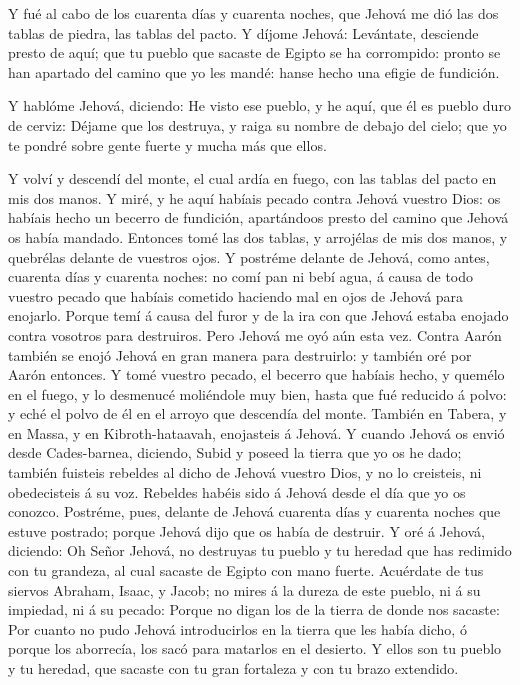  Y fué al cabo de los cuarenta días y cuarenta noches, que
Jehová me dió las dos tablas de piedra, las tablas del pacto.
 Y díjome Jehová: Levántate, desciende presto de aquí; que
tu pueblo que sacaste de Egipto se ha corrompido: pronto se han apartado
del camino que yo les mandé: hanse hecho una efigie de fundición.

 Y hablóme Jehová, diciendo: He visto ese pueblo, y he
aquí, que él es pueblo duro de cerviz:  Déjame que los
destruya, y raiga su nombre de debajo del cielo; que yo te pondré sobre
gente fuerte y mucha más que ellos.

 Y volví y descendí del monte, el cual ardía en fuego, con
las tablas del pacto en mis dos manos.  Y miré, y he aquí
habíais pecado contra Jehová vuestro Dios: os habíais hecho un becerro
de fundición, apartándoos presto del camino que Jehová os había mandado.
 Entonces tomé las dos tablas, y arrojélas de mis dos
manos, y quebrélas delante de vuestros ojos.  Y postréme
delante de Jehová, como antes, cuarenta días y cuarenta noches: no comí
pan ni bebí agua, á causa de todo vuestro pecado que habíais cometido
haciendo mal en ojos de Jehová para enojarlo.  Porque temí
á causa del furor y de la ira con que Jehová estaba enojado contra
vosotros para destruiros. Pero Jehová me oyó aún esta vez. 
Contra Aarón también se enojó Jehová en gran manera para destruirlo: y
también oré por Aarón entonces.  Y tomé vuestro pecado, el
becerro que habíais hecho, y quemélo en el fuego, y lo desmenucé
moliéndole muy bien, hasta que fué reducido á polvo: y eché el polvo de
él en el arroyo que descendía del monte.  También en
Tabera, y en Massa, y en Kibroth-hataavah, enojasteis á Jehová.
 Y cuando Jehová os envió desde Cades-barnea, diciendo,
Subid y poseed la tierra que yo os he dado; también fuisteis rebeldes al
dicho de Jehová vuestro Dios, y no lo creisteis, ni obedecisteis á su
voz.  Rebeldes habéis sido á Jehová desde el día que yo os
conozco.  Postréme, pues, delante de Jehová cuarenta días y
cuarenta noches que estuve postrado; porque Jehová dijo que os había de
destruir.  Y oré á Jehová, diciendo: Oh Señor Jehová, no
destruyas tu pueblo y tu heredad que has redimido con tu grandeza, al
cual sacaste de Egipto con mano fuerte.  Acuérdate de tus
siervos Abraham, Isaac, y Jacob; no mires á la dureza de este pueblo, ni
á su impiedad, ni á su pecado:  Porque no digan los de la
tierra de donde nos sacaste: Por cuanto no pudo Jehová introducirlos en
la tierra que les había dicho, ó porque los aborrecía, los sacó para
matarlos en el desierto.  Y ellos son tu pueblo y tu
heredad, que sacaste con tu gran fortaleza y con tu brazo extendido.

